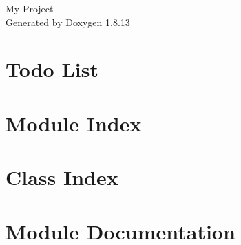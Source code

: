 \documentclass[twoside]{book}
\newcommand{\+}{\discretionary{\mbox{\scriptsize$\hookleftarrow$}}{}{}}
\newcommand{\clearemptydoublepage}{%
  \newpage{\pagestyle{empty}\cleardoublepage}%
}
\begin{document}
\hypersetup{pageanchor=false,
             bookmarksnumbered=true,
             pdfencoding=unicode
            }
\begin{titlepage}
\vspace*{7cm}
\begin{center}%
{\Large My Project }\\
\vspace*{1cm}
{\large Generated by Doxygen 1.8.13}\\
\end{center}
\end{titlepage}
\clearemptydoublepage
{}
\tableofcontents
\clearemptydoublepage
{}
\hypersetup{pageanchor=true}

\chapter{Todo List}
\label{todo}

\chapter{Module Index}

\chapter{Class Index}

\chapter{Module Documentation}
























\end{document}
